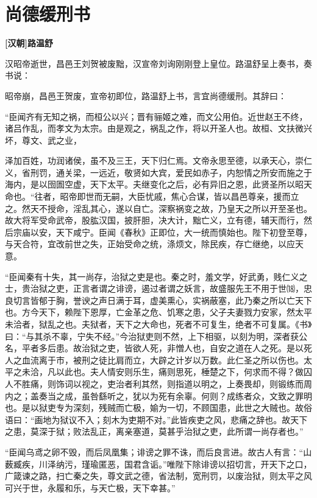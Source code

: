 \documentclass[UTF8,titlepage,oneside]{ctexbook}
\begin{document}
\chapter*{尚德缓刑书}
\begin{center}
	\textbf{[汉朝]路温舒}
\end{center}

汉昭帝逝世，昌邑王刘贺被废黜，汉宣帝刘询刚刚登上皇位。路温舒呈上奏书，奏书说：

昭帝崩，昌邑王贺废，宣帝初即位，路温舒上书，言宜尚德缓刑。其辞曰：

“臣闻齐有无知之祸，而桓公以兴；晋有骊姬之难，而文公用伯。近世赵王不终，诸吕作乱，而孝文为太宗。由是观之，祸乱之作，将以开圣人也。故桓、文扶微兴坏，尊文、武之业，

泽加百姓，功润诸侯，虽不及三王，天下归仁焉。文帝永思至德，以承天心，崇仁义，省刑罚，通关梁，一远近，敬贤如大宾，爱民如赤子，内恕情之所安而施之于海内，是以囹圄空虚，天下太平。夫继变化之后，必有异旧之恩，此贤圣所以昭天命也。“往者，昭帝即世而无嗣，大臣忧戚，焦心合谋，皆以昌邑尊亲，援而立之。然天不授命，淫乱其心，遂以自亡。深察祸变之故，乃皇天之所以开至圣也。故大将军受命武帝，股肱汉国，披肝胆，决大计，黜亡义，立有德，辅天而行，然后宗庙以安，天下咸宁。臣闻《春秋》正即位，大一统而慎始也。陛下初登至尊，与天合符，宜改前世之失，正始受命之统，涤烦文，除民疾，存亡继绝，以应天意。

“臣闻秦有十失，其一尚存，治狱之吏是也。秦之时，羞文学，好武勇，贱仁义之士，贵治狱之吏，正言者谓之诽谤，遏过者谓之妖言，故盛服先王不用于世⒅，忠良切言皆郁于胸，誉谀之声日满于耳，虚美熏心，实祸蔽塞，此乃秦之所以亡天下也。方今天下，赖陛下恩厚，亡金革之危、饥寒之患，父子夫妻戮力安家，然太平未洽者，狱乱之也。夫狱者，天下之大命也，死者不可复生，绝者不可复属。《书》曰：“与其杀不辜，宁失不经。”今治狱吏则不然，上下相驱，以刻为明，深者获公名，平者多后患。故治狱之吏，皆欲人死，非憎人也，自安之道在人之死。是以死人之血流离于市，被刑之徒比肩而立，大辟之计岁以万数。此仁圣之所以伤也。太平之未洽，凡以此也。夫人情安则乐生，痛则思死，棰楚之下，何求而不得？做囚人不胜痛，则饰词以视之，吏治者利其然，则指道以明之，上奏畏却，则锻练而周内之；盖奏当之成，虽咎繇听之，犹以为死有余辜。何则？成练者众，文致之罪明也。是以狱吏专为深刻，残贼而亡极，媮为一切，不顾国患，此世之大贼也。故俗语曰：“画地为狱议不入；刻木为吏期不对。”此皆疾吏之风，悲痛之辞也。故天下之患，莫深于狱；败法乱正，离亲塞道，莫甚乎治狱之吏，此所谓一尚存者也。”

“臣闻乌鸢之卵不毁，而后凤凰集；诽谤之罪不诛，而后良言进。故古人有言：“山薮臧疾，川泽纳污，瑾瑜匿恶，国君含诟。”唯陛下除诽谤以招切言，开天下之口，广箴谏之路，扫亡秦之失，尊文武之德，省法制，宽刑罚，以废治狱，则太平之风可兴于世，永履和乐，与天亡极，天下幸甚。”
\end{document}
